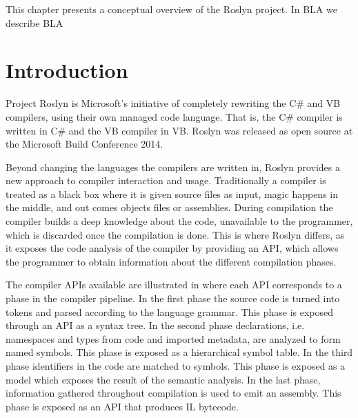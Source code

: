 \makeatletter {}\makeatother
{}
This chapter presents a conceptual overview of the Roslyn project. In BLA we describe BLA

\section{Introduction}
Project Roslyn is Microsoft's initiative of completely rewriting the C\# and \ac{VB} compilers, using their own managed code language. That is, the C\# compiler is written in C\# and the \ac{VB} compiler in \ac{VB}. Roslyn was released as open source at the Microsoft Build Conference 2014\cite{csharpBuild}.

Beyond changing the languages the compilers are written in, Roslyn provides a new approach to compiler interaction and usage. Traditionally a compiler is treated as a black box where it is given source files as input, magic happens in the middle, and out comes objects files or assemblies\cite[p. 3]{ng2012roslyn}. During compilation the compiler builds a deep knowledge about the code, unavailable to the programmer, which is discarded once the compilation is done. This is where Roslyn differs, as it exposes the code analysis of the compiler by providing an \ac{API}, which allows the programmer to obtain information about the different compilation phases\cite[p. 3]{ng2012roslyn}. 

The compiler \acp{API} available are illustrated in  where each \ac{API} corresponds to a phase in the compiler pipeline. In the first phase the source code is turned into tokens and parsed according to the language grammar. This phase is exposed through an \ac{API} as a syntax tree. In the second phase declarations, i.e. namespaces and types from code and imported metadata, are analyzed to form named symbols. This phase is exposed as a hierarchical symbol table. In the third phase identifiers in the code are matched to symbols. This phase is exposed as a model which exposes the result of the semantic analysis. In the last phase, information gathered throughout compilation is used to emit an assembly. This phase is exposed as an \ac{API} that produces IL bytecode\cite[p. 3-4]{ng2012roslyn}.

